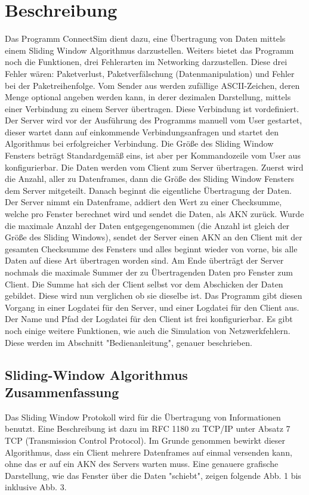 \documentclass{article}
\begin{document}
\section{Beschreibung}
Das Programm ConnectSim dient dazu, eine Übertragung von Daten mittels einem Sliding Window Algorithmus darzustellen.
Weiters bietet das Programm noch die Funktionen, drei Fehlerarten im Networking darzustellen. Diese drei Fehler wären: Paketverlust,
Paketverfälschung (Datenmanipulation) und Fehler bei der Paketreihenfolge. Vom Sender aus werden zufällige ASCII-Zeichen, deren
Menge optional angeben werden kann, in derer dezimalen Darstellung, mittels einer Verbindung zu einem Server übertragen. Diese
Verbindung ist vordefiniert. Der Server wird vor der Ausführung des Programms manuell vom User gestartet, dieser wartet dann auf einkommende Verbindungsanfragen und startet den Algorithmus bei erfolgreicher Verbindung. \newline
Die Größe des Sliding Window Fensters beträgt Standardgemäß eins, ist aber per Kommandozeile vom User aus konfigurierbar.
Die Daten werden vom Client zum Server übertragen. Zuerst wird die Anzahl, aller zu  Datenframes, dann die Größe des Sliding Window Fensters dem Server mitgeteilt. Danach beginnt die eigentliche Übertragung der Daten. Der Server nimmt ein Datenframe, addiert den Wert zu einer Checksumme, welche pro Fenster berechnet wird und sendet die Daten, als AKN zurück. Wurde die maximale Anzahl der Daten entgegengenommen (die Anzahl ist gleich der Größe des Sliding Windows), sendet der Server einen AKN an den Client mit der gesamten Checksumme des Fensters und alles beginnt wieder von vorne, bis alle Daten auf diese Art übertragen worden
sind.\newline
Am Ende überträgt der Server nochmals die maximale Summer der zu Übertragenden Daten pro Fenster zum Client. Die Summe hat sich der Client selbst vor dem Abschicken der
Daten gebildet. Diese wird nun verglichen ob sie dieselbe ist. 
\newline\newline
Das Programm gibt diesen Vorgang in einer Logdatei für den Server, und einer Logdatei für den Client aus. Der Name und Pfad der Logdatei für den Client ist frei konfigurierbar.
Es gibt noch einige weitere Funktionen, wie auch die Simulation von Netzwerkfehlern. Diese werden im Abschnitt "Bedienanleitung", genauer beschrieben.


\subsection{Sliding-Window Algorithmus Zusammenfassung}
Das Sliding Window Protokoll wird für die Übertragung von Informationen benutzt. Eine Beschreibung ist dazu im RFC 1180 zu TCP/IP unter Absatz 7 TCP (Transmission Control Protocol).
Im Grunde genommen bewirkt dieser Algorithmus, dass ein Client mehrere Datenframes auf einmal versenden kann, ohne das er auf ein AKN des Servers warten muss. Eine genauere grafische Darstellung,
wie das Fenster über die Daten "schiebt", zeigen folgende Abb. 1 bis inklusive Abb. 3.
\end{document}
